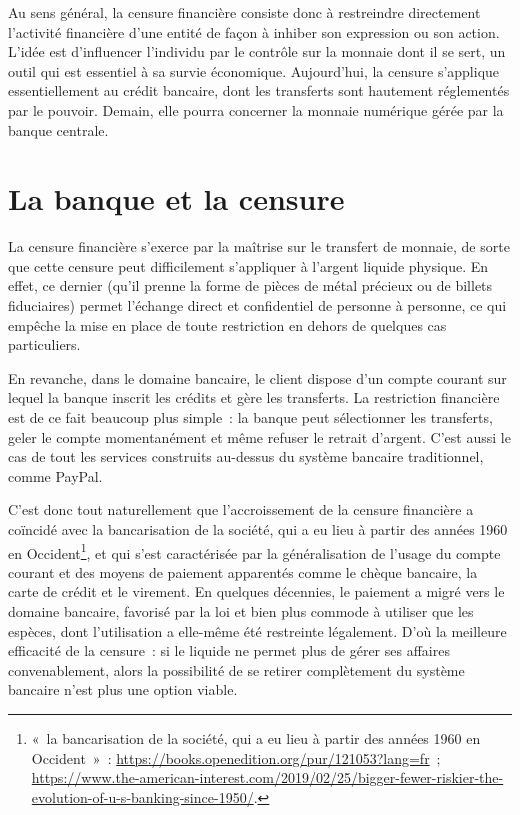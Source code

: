 Au sens général, la censure financière consiste donc à restreindre directement l'activité financière d'une entité de façon à inhiber son expression ou son action. L'idée est d'influencer l'individu par le contrôle sur la monnaie dont il se sert, un outil qui est essentiel à sa survie économique. Aujourd'hui, la censure s'applique essentiellement au crédit bancaire, dont les transferts sont hautement réglementés par le pouvoir. Demain, elle pourra concerner la monnaie numérique gérée par la banque centrale.

\section*{La banque et la censure}

La censure financière s'exerce par la maîtrise sur le transfert de monnaie, de sorte que cette censure peut difficilement s'appliquer à l'argent liquide physique. En effet, ce dernier (qu'il prenne la forme de pièces de métal précieux ou de billets fiduciaires) permet l'échange direct et confidentiel de personne à personne, ce qui empêche la mise en place de toute restriction en dehors de quelques cas particuliers.

En revanche, dans le domaine bancaire, le client dispose d'un compte courant sur lequel la banque inscrit les crédits et gère les transferts. La restriction financière est de ce fait beaucoup plus simple~: la banque peut sélectionner les transferts, geler le compte momentanément et même refuser le retrait d'argent. C'est aussi le cas de tout les services construits au-dessus du système bancaire traditionnel, comme PayPal.

C'est donc tout naturellement que l'accroissement de la censure financière a coïncidé avec la bancarisation de la société, qui a eu lieu à partir des années 1960 en Occident\footnote{«~la bancarisation de la société, qui a eu lieu à partir des années 1960 en Occident~»~: \url{https://books.openedition.org/pur/121053?lang=fr}~; \url{https://www.the-american-interest.com/2019/02/25/bigger-fewer-riskier-the-evolution-of-u-s-banking-since-1950/}.}, et qui s'est caractérisée par la généralisation de l'usage du compte courant et des moyens de paiement apparentés comme le chèque bancaire, la carte de crédit et le virement. En quelques décennies, le paiement a migré vers le domaine bancaire, favorisé par la loi et bien plus commode à utiliser que les espèces, dont l'utilisation a elle-même été restreinte légalement. D'où la meilleure efficacité de la censure~: si le liquide ne permet plus de gérer ses affaires convenablement, alors la possibilité de se retirer complètement du système bancaire n'est plus une option viable.

